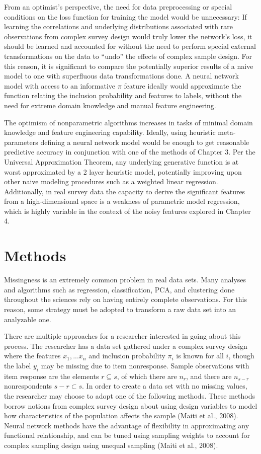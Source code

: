\documentclass[12pt,twoside]{reedthesis}
\begin{document}
From an optimist's perspective, the need for data preprocessing or
special conditions on the loss function for training the model would be
unnecessary: If learning the correlations and underlying distributions
associated with rare observations from complex survey design would truly
lower the network's loss, it should be learned and accounted for without
the need to perform special external transformations on the data to
``undo'' the effects of complex sample design. For this reason, it is
significant to compare the potentially superior results of a naive model
to one with superfluous data transformations done. A neural network
model with access to an informative \(\pi\) feature ideally would
approximate the function relating the inclusion probability and features
to labels, without the need for extreme domain knowledge and manual
feature engineering.

The optimism of nonparametric algorithms increases in tasks of minimal
domain knowledge and feature engineering capability. Ideally, using
heuristic meta-parameters defining a neural network model would be
enough to get reasonable predictive accuracy in conjunction with one of
the methods of Chapter 3. Per the Universal Approximation Theorem, any
underlying generative function is at worst approximated by a 2 layer
heuristic model, potentially improving upon other naive modeling
procedures such as a weighted linear regression. Additionally, in real
survey data the capacity to derive the significant features from a
high-dimensional space is a weakness of parametric model regression,
which is highly variable in the context of the noisy features explored
in Chapter 4.

\chapter{Methods}\label{methods}

Missingness is an extremely common problem in real data sets. Many
analyses and algorithms such as regression, classification, PCA, and
clustering done throughout the sciences rely on having entirely complete
observations. For this reason, some strategy must be adopted to
transform a raw data set into an analyzable one.

There are multiple approaches for a researcher interested in going about
this process. The researcher has a data set gathered under a complex
survey design where the features \(x_1,...x_n\) and inclusion
probability \(\pi_i\) is known for all \(i\), though the label \(y_i\)
may be missing due to item nonresponse. Sample observations with item
response are the elements \(r \subseteq s\), of which there are \(n_r\),
and there are \(n_{s-r}\) nonrespondents \(s-r \subset s\). In order to
create a data set with no missing values, the researcher may choose to
adopt one of the following methods. These methods borrow notions from
complex survey design about using design variables to model how
characteristics of the population affects the sample (Maiti et al.,
2008). Neural network methods have the advantage of flexibility in
approximating any functional relationship, and can be tuned using
sampling weights to account for complex sampling design using unequal
sampling (Maiti et al., 2008).
\end{document}
